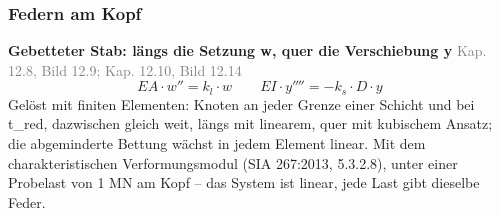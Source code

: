 \documentclass[11pt,a4paper]{article}
\newcommand{\normref}[1]{{\small\textcolor{gray}{#1}}}
\begin{document}
\subsubsection{Federn am Kopf}
\noindent\textbf{Gebetteter Stab: längs die Setzung w, quer die Verschiebung y} \hfill \normref{Kap. 12.8, Bild 12.9; Kap. 12.10, Bild 12.14}
\begin{equation*}
EA \cdot w'' = k_l \cdot w \qquad EI \cdot y'''' = -k_s \cdot D \cdot y
\end{equation*}
Gelöst mit finiten Elementen: Knoten an jeder Grenze einer Schicht und bei t\_red, dazwischen gleich weit, längs mit linearem, quer mit kubischem Ansatz; die abgeminderte Bettung wächst in jedem Element linear. Mit dem charakteristischen Verformungsmodul (SIA 267:2013, 5.3.2.8), unter einer Probelast von 1 MN am Kopf -- das System ist linear, jede Last gibt dieselbe Feder.
\end{document}

